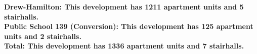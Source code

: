 \bf{Drew-Hamilton}: This development has 1211 apartment units and 5 stairhalls.\\\bf{Public School 139 (Conversion)}: This development has 125 apartment units and 2 stairhalls.\\\bf{Total}: This development has 1336 apartment units and 7 stairhalls.\\